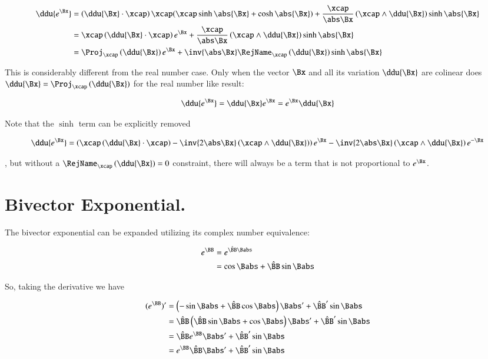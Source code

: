 \begin{align*}
\ddu{e^{\Bx}} 
&= 
\left(\ddu{\Bx} \cdot \xcap\right) \xcap
( \xcap \sinh\abs{\Bx} + \cosh\abs{\Bx} ) 
 + \frac{\xcap}{\abs\Bx} \left(\xcap \wedge \ddu{\Bx} \right) \sinh\abs{\Bx} \\
&= 
\xcap \left(\ddu{\Bx} \cdot \xcap\right)e^{\Bx}
 + \frac{\xcap}{\abs\Bx} \left(\xcap \wedge \ddu{\Bx} \right) \sinh\abs{\Bx} \\
&= 
\Proj_{\xcap}\left(\ddu{\Bx}\right) e^{\Bx}
 + \inv{\abs\Bx} \RejName_{\xcap}\left(\ddu{\Bx}\right) \sinh\abs{\Bx} \\
\end{align*}

This is considerably different from the real number case.  Only when the vector $\Bx$ and all its variation
$\ddu{\Bx}$ are colinear does $\ddu{\Bx} = \Proj_{\xcap}\left(\ddu{\Bx}\right)$ for the real number like result:

\begin{equation}
\ddu{e^{\Bx}} = \ddu{\Bx} e^{\Bx} = e^{\Bx} \ddu{\Bx} 
\end{equation}

Note that the $\sinh$ term can be explicitly removed

\begin{align*}
\ddu{e^{\Bx}} 
=
\left(\xcap \left(\ddu{\Bx} \cdot \xcap\right) - \inv{2\abs\Bx}\left(\xcap \wedge \ddu{\Bx} \right) \right) e^{\Bx}
 - \inv{2\abs\Bx}\left(\xcap \wedge \ddu{\Bx} \right) e^{-\Bx} \\
\end{align*}

, but without a $\RejName_{\xcap}\left(\ddu{\Bx}\right) = 0$
constraint, there will always be a term that is not proportional to $e^{\Bx}$.

\section{Bivector Exponential. }

The bivector exponential can be expanded utilizing its complex number equivalence:

\begin{align*}
e^{\BB}
&= e^{\Bcap\Babs} \\
&= \cos{\Babs} + \Bcap\sin{\Babs} \\
\end{align*}

So, taking the derivative we have

\begin{align*}
(e^{\BB})'
&= \left(-\sin\Babs + \Bcap\cos\Babs\right)\Babs' + \Bcap' \sin\Babs \\
&= \Bcap \left(\Bcap\sin\Babs + \cos\Babs\right)\Babs' + \Bcap' \sin\Babs \\
&= \Bcap e^{\BB} \Babs' + \Bcap' \sin\Babs \\
&= e^{\BB} \Bcap \Babs' + \Bcap' \sin\Babs \\
\end{align*}


